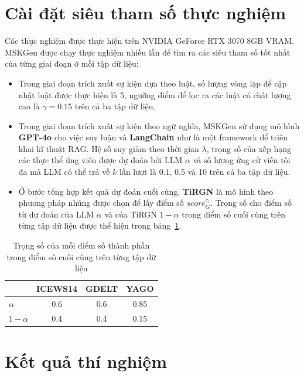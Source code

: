 \section{Cài đặt siêu tham số thực nghiệm}
Các thực nghiệm được thực hiện trên NVIDIA GeForce RTX 3070 8GB VRAM. MSKGen được chạy thực nghiệm nhiều lần để tìm ra các siêu tham số
tốt nhất của từng giai đoạn ở mỗi tập dữ liệu:
\begin{itemize}
    \item Trong giai đoạn trích xuất sự kiện dựa theo luật, số lượng vòng lặp để cập nhật luật được thực hiện là 5, 
ngưỡng điểm để lọc ra các luật có chất lượng cao là $\gamma = 0.15$ trên cả ba tập dữ liệu.
    \item Trong giai đoạn trích xuất sự kiện theo ngữ nghĩa, MSKGen sử dụng mô hình \textbf{GPT-4o} cho việc suy luận và
    \textbf{LangChain} \cite{ref_article37} như là một framework để triên khai kĩ thuật RAG.  
    Hệ số suy giảm theo thời gian $\lambda$, trọng số của xếp hạng các thực thể ứng viên được dự đoán bởi LLM $\alpha$ và
    số lượng ứng cử viên tối đa mà LLM có thể trả về $k$ lần lượt là 0.1, 0.5 và 10 trên cả ba tập dữ liệu. 
    \item Ở bước tổng hợp kết quả dự đoán cuối cùng, \textbf{TiRGN} là mô hình theo phương pháp nhúng được chọn để lấy điểm số $score_{G}^{c_i}$. 
    Trọng số cho điểm số từ dự đoán của LLM $\alpha$ và của TiRGN $1 - \alpha$
    trong điểm số cuối cùng trên từng tập dữ liệu được thể hiện trong bảng~\ref{tab:table53_professional}.
\end{itemize}

\begin{table}[H]
    \centering
    \caption{Trọng số của mỗi điểm số thành phần trong điểm số cuối cùng trên từng tập dữ liệu}
    \label{tab:table53_professional}
    \begin{tabular}{l ccc} 
        \toprule %
        & \textbf{ICEWS14} & \textbf{GDELT} & \textbf{YAGO} \\
        \midrule %
        $\alpha$   & 0.6     & 0.6   & 0.85 \\
        $1-\alpha$ & 0.4     & 0.4   & 0.15 \\
        \bottomrule %
    \end{tabular}
\end{table}
  

\section{Kết quả thí nghiệm}
